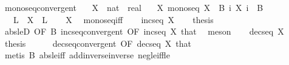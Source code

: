 \begin{isabellebody}
%
\isadelimproof
\isanewline
%
\endisadelimproof
\isanewline
{}\isamarkupfalse%
\ monoseq{\isacharunderscore}{\kern0pt}convergent{\isacharcolon}{\kern0pt}\isanewline
\ \ \ X\ {\isacharcolon}{\kern0pt}{\isacharcolon}{\kern0pt}\ {\isachardoublequoteopen}nat\ {\isasymRightarrow}\ real{\isachardoublequoteclose}\isanewline
\ \ \ X{\isacharcolon}{\kern0pt}\ {\isachardoublequoteopen}monoseq\ X{\isachardoublequoteclose}\ \ B{\isacharcolon}{\kern0pt}\ {\isachardoublequoteopen}{\isasymAnd}i{\isachardot}{\kern0pt}\ {\isasymbar}X\ i{\isasymbar}\ {\isasymle}\ B{\isachardoublequoteclose}\isanewline
\ \ \ L\ \ {\isachardoublequoteopen}X\ {\isasymlonglonglongrightarrow}\ L{\isachardoublequoteclose}\isanewline
%
\isadelimproof
\ \ %
\endisadelimproof
%
\isatagproof
{}\isamarkupfalse%
\ X\ \isamarkupfalse%
\ monoseq{\isacharunderscore}{\kern0pt}iff\isanewline
{}\isamarkupfalse%
\isanewline
\ \ \isamarkupfalse%
\ {\isachardoublequoteopen}incseq\ X{\isachardoublequoteclose}\isanewline
\ \ \isamarkupfalse%
\ thesis\isanewline
\ \ \ \ \isamarkupfalse%
\ abs{\isacharunderscore}{\kern0pt}le{\isacharunderscore}{\kern0pt}D{}\ {\isacharbrackleft}{\kern0pt}OF\ B{\isacharbrackright}{\kern0pt}\ incseq{\isacharunderscore}{\kern0pt}convergent\ {\isacharbrackleft}{\kern0pt}OF\ {\isacartoucheopen}incseq\ X{\isacartoucheclose}{\isacharbrackright}{\kern0pt}\ that\ \isamarkupfalse%
\ meson\isanewline
{}\isamarkupfalse%
\isanewline
\ \ \isamarkupfalse%
\ {\isachardoublequoteopen}decseq\ X{\isachardoublequoteclose}\isanewline
\ \ \isamarkupfalse%
\ thesis\isanewline
\ \ \ \ \isamarkupfalse%
\ decseq{\isacharunderscore}{\kern0pt}convergent\ {\isacharbrackleft}{\kern0pt}OF\ {\isacartoucheopen}decseq\ X{\isacartoucheclose}{\isacharbrackright}{\kern0pt}\ that\isanewline
\ \ \ \ \isamarkupfalse%
\ {\isacharparenleft}{\kern0pt}metis\ B\ abs{\isacharunderscore}{\kern0pt}le{\isacharunderscore}{\kern0pt}iff\ add{\isachardot}{\kern0pt}inverse{\isacharunderscore}{\kern0pt}inverse\ neg{\isacharunderscore}{\kern0pt}le{\isacharunderscore}{\kern0pt}iff{\isacharunderscore}{\kern0pt}le{\isacharparenright}{\kern0pt}\isanewline
{}\isamarkupfalse%
%
\endisatagproof
{\isafoldproof}%
%
\isadelimproof
%
\endisadelimproof
%
\isadelimdocument
%
\endisadelimdocument
%
\isatagdocument

\end{isabellebody}
